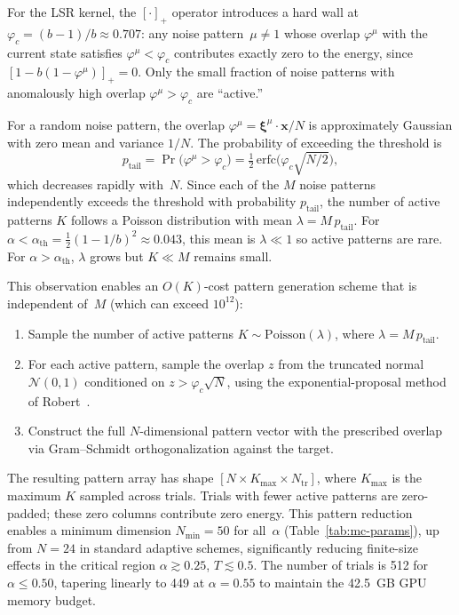 \documentclass[11pt]{article}
\begin{document}
For the LSR kernel, the $[\cdot]_+$ operator introduces a hard wall at $\varphi_c = (b-1)/b \approx 0.707$: any noise pattern~$\mu \neq 1$ whose overlap $\varphi^\mu$ with the current state satisfies $\varphi^\mu < \varphi_c$ contributes exactly zero to the energy, since $[1 - b(1-\varphi^\mu)]_+ = 0$.
Only the small fraction of noise patterns with anomalously high overlap $\varphi^\mu > \varphi_c$ are ``active.''

For a random noise pattern, the overlap $\varphi^\mu = \boldsymbol{\xi}^\mu \!\cdot\! \bm{x} / N$ is approximately Gaussian with zero mean and variance $1/N$.
The probability of exceeding the threshold is
\begin{equation}\label{eq:p-tail}
    p_{\mathrm{tail}} = \Pr\bigl(\varphi^\mu > \varphi_c\bigr) = \tfrac{1}{2}\,\mathrm{erfc}\!\bigl(\varphi_c\sqrt{N/2}\bigr),
\end{equation}
which decreases rapidly with~$N$. 
Since each of the $M$ noise patterns independently exceeds the threshold with probability $p_{\mathrm{tail}}$, the number of active patterns $K$ follows a Poisson distribution with mean $\lambda = M\, p_{\mathrm{tail}}$.
For $\alpha < \alpha_{\mathrm{th}} = \tfrac{1}{2}(1-1/b)^2 \approx 0.043$, this mean is $\lambda \ll 1$ so active patterns are rare.
For $\alpha > \alpha_{\mathrm{th}}$, $\lambda$ grows but $K \ll M$ remains small.

This observation enables an $O(K)$-cost pattern generation scheme that is independent of~$M$ (which can exceed $10^{12}$):
\begin{enumerate}
    \item Sample the number of active patterns $K \sim \mathrm{Poisson}(\lambda)$, where $\lambda = M\, p_{\mathrm{tail}}$.
    \item For each active pattern, sample the overlap $z$ from the truncated normal $\mathcal{N}(0,1)$ conditioned on $z > \varphi_c\sqrt{N}$, using the exponential-proposal method of Robert~\cite{Robert1995}.
    \item Construct the full $N$-dimensional pattern vector with the prescribed overlap via Gram--Schmidt orthogonalization against the target.
\end{enumerate}
The resulting pattern array has shape $[N \times K_{\max} \times N_{\mathrm{tr}}]$, where $K_{\max}$ is the maximum $K$ sampled across trials. Trials with fewer active patterns are zero-padded; these zero columns contribute zero energy. This pattern reduction enables a minimum dimension $N_{\min} = 50$ for all~$\alpha$ (Table~\ref{tab:mc-params}), up from $N = 24$ in standard adaptive schemes, significantly reducing finite-size effects in the critical region $\alpha \gtrsim 0.25$, $T \lesssim 0.5$. The number of trials is 512 for $\alpha \le 0.50$, tapering linearly to 449 at $\alpha = 0.55$ to maintain the 42.5~GB GPU memory budget.
\end{document}
